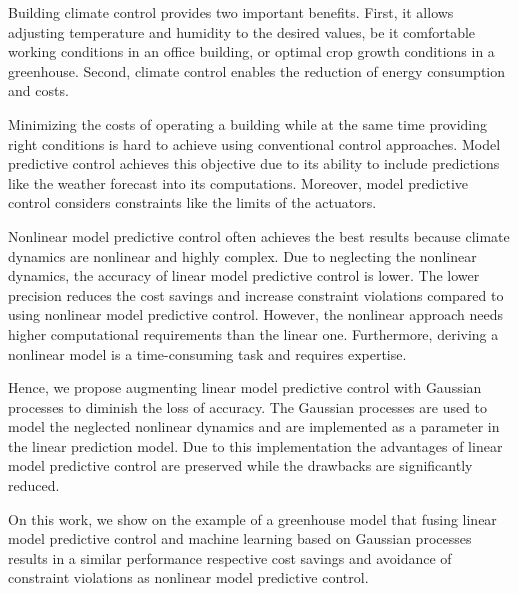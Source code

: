 
Building climate control provides two important benefits.
First, it allows adjusting temperature and humidity to the desired values, be it comfortable working conditions in an office building, or optimal crop growth conditions in a greenhouse.
Second, climate control enables the reduction of energy consumption and costs.

Minimizing the costs of operating a building while at the same time providing right conditions is hard to achieve using conventional control approaches.
Model predictive control achieves this objective due to its ability to include predictions like the weather forecast into its computations.
Moreover, model predictive control considers constraints like the limits of the actuators.

Nonlinear model predictive control often achieves the best results because climate dynamics are nonlinear and highly complex.
Due to neglecting the nonlinear dynamics, the accuracy of linear model predictive control is lower.
The lower precision reduces the cost savings and increase constraint violations compared to using nonlinear model predictive control.
However, the nonlinear approach needs higher computational requirements than the linear one.
Furthermore, deriving a nonlinear model is a time-consuming task and requires expertise.

Hence, we propose augmenting linear model predictive control with Gaussian processes to diminish the loss of accuracy.
The Gaussian processes are used to model the neglected nonlinear dynamics and are implemented as a parameter in the linear prediction model.
Due to this implementation the advantages of linear model predictive control are preserved while the drawbacks are significantly reduced.

On this work, we show on the example of a greenhouse model that fusing linear model predictive control and machine learning based on Gaussian processes results in a similar performance respective cost savings and avoidance of constraint violations as nonlinear model predictive control.

